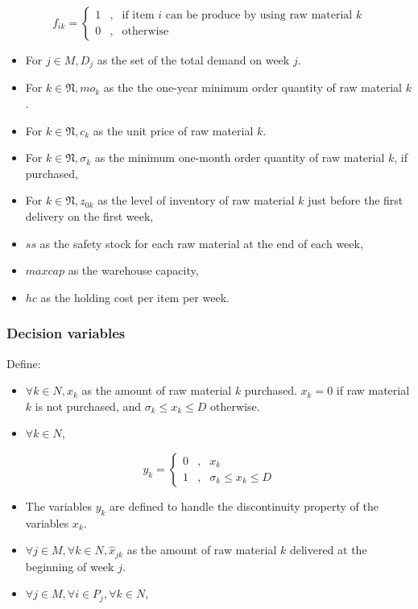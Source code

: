 \documentclass[preprint, 3p,
authoryear]{elsarticle} %
\providecommand{\tightlist}{%
  \setlength{\itemsep}{0pt}\setlength{\parskip}{0pt}}
\begin{document}
\[f_{ik} = 
\left\{\begin{matrix}
1 & , & \text{if item } i \text{ can be produce by using raw material } k  \\ 
0 & , & \text{otherwise}
\end{matrix}\right. 
\]

\begin{itemize}
\tightlist
\item
  For \(j \in M, D_j\) as the set of the total demand on week \(j\).
\item
  For \(k \in \mathfrak{N}, mo_k\) as the the one-year minimum order
  quantity of raw material \(k\).
\item
  For \(k \in \mathfrak{N}, c_k\) as the unit price of raw material
  \(k\).
\item
  For \(k \in \mathfrak{N}, \sigma_k\) as the minimum one-month order
  quantity of raw material \(k\), if purchased,
\item
  For \(k \in \mathfrak{N}, z_{0k}\) as the level of inventory of raw
  material \(k\) just before the first delivery on the first week,
\item
  \(ss\) as the safety stock for each raw material at the end of each
  week,
\item
  \(maxcap\) as the warehouse capacity,
\item
  \(hc\) as the holding cost per item per week.
\end{itemize}

\hypertarget{decision-variables}{%
\subsubsection{Decision variables}\label{decision-variables}}

Define:

\begin{itemize}
\tightlist
\item
  \(\forall k \in N, x_k\) as the amount of raw material \(k\)
  purchased. \(x_k = 0\) if raw material \(k\) is not purchased, and
  \(\sigma_k \leq x_k \leq D\) otherwise.
\item
  \(\forall k \in N\),
\end{itemize}

\[y_k = 
\left\{\begin{matrix}
0 & , & x_k  \\ 
1 & , & \sigma_k \leq x_k \leq D
\end{matrix}\right. 
\]

\begin{itemize}
\tightlist
\item
  The variables \(y_k\) are defined to handle the discontinuity property
  of the variables \(x_k\).
\item
  \(\forall j \in M, \forall k \in N, \hat{x}_{jk}\) as the amount of
  raw material \(k\) delivered at the beginning of week \(j\).
\item
  \(\forall j \in M, \forall i \in P_j, \forall k \in N,\)
\end{itemize}
\end{document}
